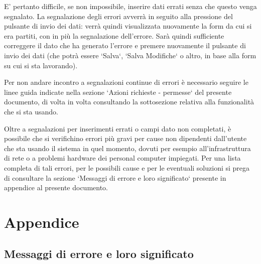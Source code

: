 \documentclass[11pt,a4paper]{article}
\begin{document}
E' pertanto difficile, se non impossibile, inserire dati errati senza che questo venga segnalato.
La segnalazione degli errori avverrà in seguito alla pressione del pulsante di invio dei dati: verrà quindi visualizzata nuovamente la form da cui si era partiti, con in più la segnalazione dell'errore. Sarà quindi sufficiente correggere il dato che ha generato l'errore e premere nuovamente il pulsante di invio dei dati (che potrà essere `Salva`, `Salva Modifiche` o altro, in base alla form su cui si sta lavorando).

Per non andare incontro a segnalazioni continue di errori è necessario seguire le linee guida indicate nella sezione `Azioni richieste - permesse` del presente documento, di volta in volta consultando la sottosezione relativa alla funzionalità che si sta usando.

Oltre a segnalazioni per inserimenti errati o campi dato non completati, è possibile che si verifichino errori più gravi per cause non dipendenti dall'utente che sta usando il sistema in quel momento, dovuti per esempio all'infrastruttura di rete o a problemi hardware dei personal computer impiegati.
Per una lista completa di tali errori, per le possibili cause e per le eventuali soluzioni si prega di consultare la sezione `Messaggi di errore e loro significato` presente in appendice al presente documento.
\newpage
\section{Appendice}
\subsection{Messaggi di errore e loro significato}
\end{document}
